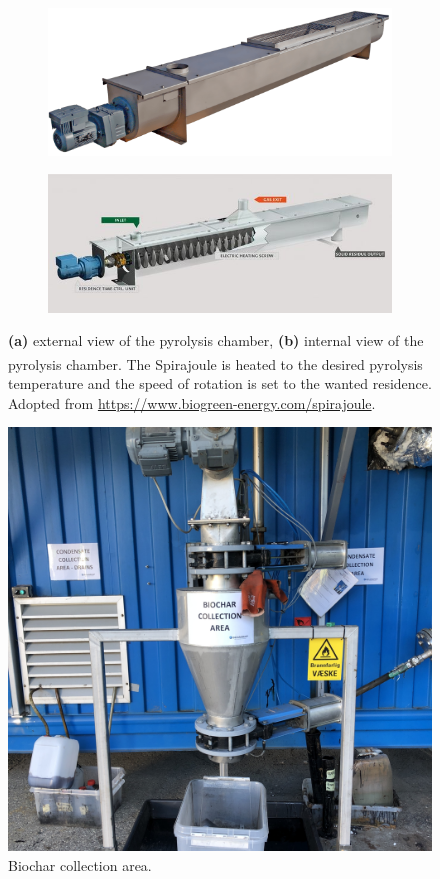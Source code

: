 \begin{figure}
    \centering
     \begin{subfigure}[t]{\linewidth}
         \centering
         \includegraphics[width=0.74\linewidth,scale=0.74]{Bilder/Pyrolysis/PyrolyzerChamber.png}
         \caption{}
     \end{subfigure}
    \centering
    \begin{subfigure}[b]{\linewidth}
         \centering
         \includegraphics[width=0.74\linewidth,scale=0.74]{Bilder/Pyrolysis/spirajoule.jpeg}
         \caption{}
     \end{subfigure}
    \caption{\textbf{(a)} external view of the pyrolysis chamber, \textbf{(b)} internal view of the pyrolysis chamber. The Spirajoule\textsuperscript{\textregistered} is heated to the desired pyrolysis temperature and the speed of rotation is set to the wanted residence. Adopted from \url{https://www.biogreen-energy.com/spirajoule}.}
    \label{fig:pyrolysischamber}
\end{figure}

\begin{figure}
    \centering
    \includegraphics[width=0.6\linewidth,scale=0.6]{Bilder/Pyrolysis/BiocharCollection.jpg}
    \caption{Biochar collection area.}
    \label{fig:biocharCollection}
\end{figure}

